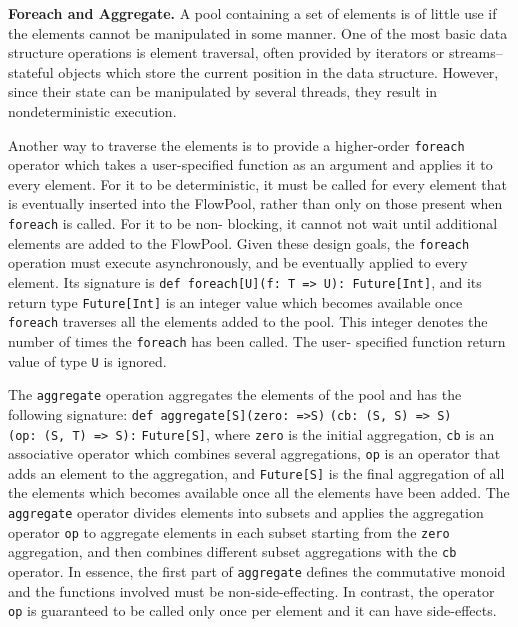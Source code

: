 \documentclass[runningheads,a4paper]{llncs}
\begin{document}

\textbf{Foreach and Aggregate.}
A pool containing a set of elements is of little use if the elements cannot be
manipulated in some manner. One of the most basic data structure operations is
element traversal, often provided by iterators or streams-- stateful objects
which store the current position in the data structure. However, since their
state can be manipulated by several threads, they result in nondeterministic
execution.

Another way to traverse the elements is to provide a higher-order
\verb=foreach= operator which takes a user-specified function as an argument
and applies it to every element. For it to be deterministic, it must be called
for every element that is eventually inserted into the FlowPool, rather than
only on those present when \verb=foreach= is called. For it to be non-
blocking, it cannot not wait until additional elements are added to the
FlowPool. Given these design goals, the \verb=foreach= operation must execute
asynchronously, and be eventually applied to every element. Its signature is
\verb+def foreach[U](f: T => U): Future[Int]+, and its  return type
\verb=Future[Int]= is an integer value which becomes available once
\verb=foreach= traverses all the elements added to the pool. This integer
denotes the number of times the \verb=foreach= has been called. The user-
specified function return value of type \verb=U= is ignored.

The \verb=aggregate= operation aggregates the elements of the pool
and has the following signature: \verb+def aggregate[S]+\verb+(zero: =>S)+
\verb+(cb: (S, S) => S)+\\
\verb+(op: (S, T) => S):+ \verb+Future[S]+,
where \verb=zero= is the initial aggregation, \verb=cb= is an
associative operator which combines several aggregations, \verb=op= is
an operator that adds an element to the aggregation, and
\verb=Future[S]= is the final aggregation of all the elements which
becomes available once all the elements have been added.
The \verb=aggregate= operator divides elements into subsets and applies the
aggregation operator \verb=op= to aggregate elements in each subset
starting from the \verb=zero= aggregation, and then combines
different subset aggregations with the \verb=cb= operator.
In essence, the first part of \verb=aggregate= defines the commutative
monoid and the functions involved must be non-side-effecting.
In contrast, the operator \verb=op= is guaranteed to be called only once per
element and it can have side-effects.
\end{document}
